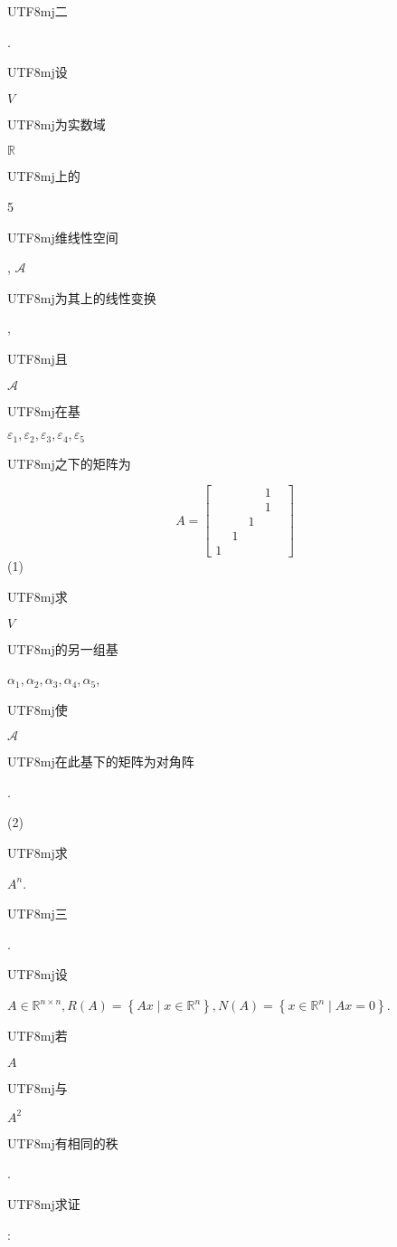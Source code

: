 \documentclass[10pt]{article}
\begin{document}
\begin{CJK}{UTF8}{mj}二\end{CJK}. \begin{CJK}{UTF8}{mj}设\end{CJK} $V$ \begin{CJK}{UTF8}{mj}为实数域\end{CJK} $\mathbb{R}$ \begin{CJK}{UTF8}{mj}上的\end{CJK} 5 \begin{CJK}{UTF8}{mj}维线性空间\end{CJK}, $\mathscr{A}$ \begin{CJK}{UTF8}{mj}为其上的线性变换\end{CJK}, \begin{CJK}{UTF8}{mj}且\end{CJK} $\mathscr{A}$ \begin{CJK}{UTF8}{mj}在基\end{CJK} $\varepsilon_{1}, \varepsilon_{2}, \varepsilon_{3}, \varepsilon_{4}, \varepsilon_{5}$ \begin{CJK}{UTF8}{mj}之下的矩阵为\end{CJK}
$$
A=\left[\begin{array}{lllll} 
& & & 1 \\
& & & 1 & \\
& & 1 & & \\
& 1 & & & \\
1 & & & &
\end{array}\right]
$$
(1) \begin{CJK}{UTF8}{mj}求\end{CJK} $V$ \begin{CJK}{UTF8}{mj}的另一组基\end{CJK} $\alpha_{1}, \alpha_{2}, \alpha_{3}, \alpha_{4}, \alpha_{5}$, \begin{CJK}{UTF8}{mj}使\end{CJK} $\mathscr{A}$ \begin{CJK}{UTF8}{mj}在此基下的矩阵为对角阵\end{CJK}.

(2) \begin{CJK}{UTF8}{mj}求\end{CJK} $A^{n}$.

\begin{CJK}{UTF8}{mj}三\end{CJK}. \begin{CJK}{UTF8}{mj}设\end{CJK} $A \in \mathbb{R}^{n \times n}, R(A)=\left\{A x \mid x \in \mathbb{R}^{n}\right\}, N(A)=\left\{x \in \mathbb{R}^{n} \mid A x=0\right\}$. \begin{CJK}{UTF8}{mj}若\end{CJK} $A$ \begin{CJK}{UTF8}{mj}与\end{CJK} $A^{2}$ \begin{CJK}{UTF8}{mj}有相同的秩\end{CJK}. \begin{CJK}{UTF8}{mj}求证\end{CJK}:
\end{document}
